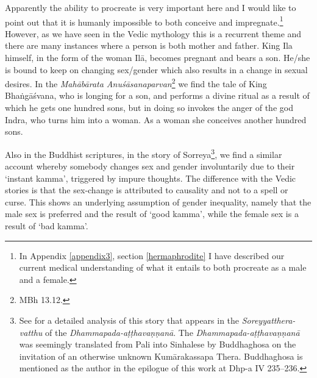 Apparently the ability to procreate is very important here and I would like to point out that it is humanly impossible to both conceive and impregnate.\footnote{In Appendix \ref{appendix3}, section \ref{hermaphrodite} I have described our current medical understanding of what it entails to both procreate as a male and a female.} However, as we have seen in the Vedic mythology this is a recurrent theme and there are many instances where a person is both mother and father. King Ila himself, in the form of the woman Ilā, becomes pregnant and bears a son. He/she is bound to keep on changing sex/gender which also results in a change in sexual desires. In the {\em Mahābārata Anuśāsanaparvan}\footnote{MBh 13.12.} we find the tale of King Bhaṅgāśvana, who is longing for a son, and performs a divine ritual as a result of which he gets one hundred sons, but in doing so invokes the anger of the god Indra, who turns him into a woman. As a woman she conceives another hundred sons. 

Also in the Buddhist scriptures, in the story of Sorreya\footnote{See \cite{dhammadinna} for a detailed analysis of this story that appears in the {\em Soreyyatthera-vatthu} of the {\em Dhammapada-aṭṭhavaṇṇanā}. The {\em Dhammapada-aṭṭhavaṇṇanā} was seemingly translated from Pali into Sinhalese by Buddhaghosa on the invitation of an otherwise unknown Kumārakassapa Thera. Buddhaghosa is mentioned as the author in the epilogue of this work at Dhp-a IV 235–236.}, we find a similar account whereby somebody changes sex and gender involuntarily due to their `instant kamma’, triggered by impure thoughts. The difference with the Vedic stories is that the sex-change is attributed to causality and not to a spell or curse. This shows an underlying assumption of gender inequality, namely that the male sex is preferred and the result of `good kamma', while the female sex is a result of `bad kamma'.

